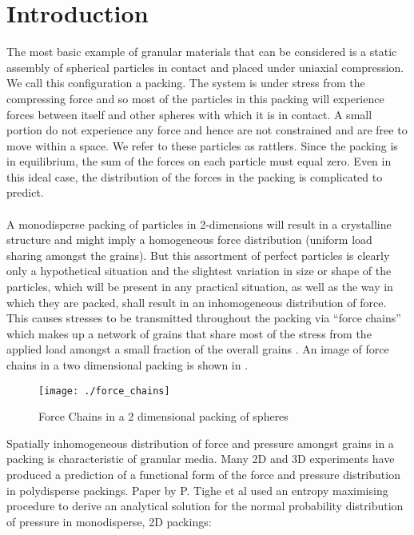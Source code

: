 \documentclass[12pt] {article} %
\begin{document}
\section{Introduction}
The most basic example of granular materials that can be considered is a static assembly of spherical particles in contact and placed under uniaxial compression. We call this configuration a packing. The system is under stress from the compressing force and so most of the particles in this packing will experience forces between itself and other spheres with which it is in contact. A small portion do not experience any force and hence are not constrained and are free to move within a space. We refer to these particles as rattlers. Since the packing is in equilibrium, the sum of the forces on each particle must equal zero. Even in this ideal case, the distribution of the forces in the packing is complicated to predict.\\
\\
A monodisperse packing of particles in 2-dimensions will result in a crystalline structure and might imply a homogeneous force distribution (uniform load sharing amongst the grains). But this assortment of perfect particles is clearly only a hypothetical situation and the slightest variation in size or shape of the particles, which will be present in any practical situation, as well as the way in which they are packed, shall result in an inhomogeneous distribution of force. This causes stresses to be transmitted throughout the packing via “force chains” which makes up a network of grains that share most of the stress from the applied load amongst a small fraction of the overall grains \cite{mueth}. An image of force chains in a two dimensional packing is shown in .

\begin{figure}
	\centering
	\texttt{[image: ./force\_chains]}
	\caption{Force Chains in a 2 dimensional packing of spheres \cite{cathal}}
	\label{fig:force_chains}
\end{figure}

Spatially inhomogeneous distribution of force and pressure amongst grains in a packing is characteristic of granular media. Many 2D and 3D experiments have produced a prediction of a functional form of the force and pressure distribution in polydisperse packings. Paper by P. Tighe et al \cite{tighepaper} used an entropy maximising procedure to derive an analytical solution for the normal probability distribution of pressure in monodisperse, 2D packings:
\end{document}
